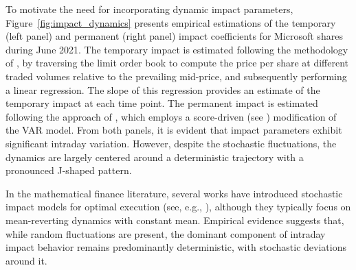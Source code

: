 \documentclass[final,3p,authoryear,12pt]{elsarticle}
\begin{document}
To motivate the need for incorporating dynamic impact parameters, Figure~\ref{fig:impact_dynamics} presents empirical estimations of the temporary (left panel) and permanent (right panel) impact coefficients for Microsoft shares during June 2021. The temporary impact is estimated following the methodology of \cite{cartea2016incorporating}, by traversing the limit order book to compute the price per share at different traded volumes relative to the prevailing mid-price, and subsequently performing a linear regression. The slope of this regression provides an estimate of the temporary impact at each time point. The permanent impact is estimated following the approach of \cite{campigli2022measuring}, which employs a score-driven (see \cite{blasques2015information}) modification of the  \cite{hasbrouck1991measuring} VAR model. From both panels, it is evident that impact parameters exhibit significant intraday variation. However, despite the stochastic fluctuations, the dynamics are largely centered around a deterministic trajectory with a pronounced J-shaped pattern. 

In the mathematical finance literature, several works have introduced stochastic
impact models for optimal execution (see, e.g.,
\cite{cartea2015optimal,gueant2016financial,barger2019optimal}), although they
typically focus on mean-reverting dynamics with constant mean. Empirical
evidence suggests that, while random fluctuations are present, the dominant
component of intraday impact behavior remains predominantly deterministic, with
stochastic deviations around it.
 
\end{document}

